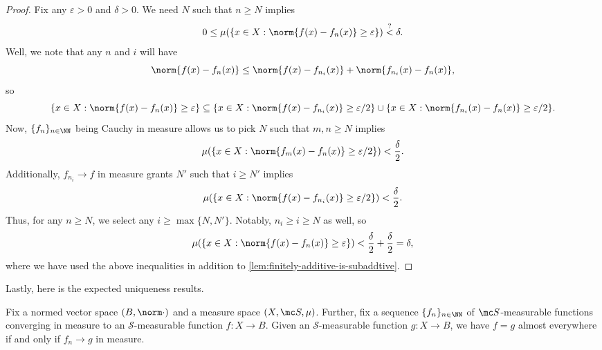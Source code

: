\documentclass[../notes.tex]{subfiles}
\begin{document}
\begin{proof}
	Fix any $\varepsilon>0$ and $\delta>0$. We need $N$ such that $n\ge N$ implies
	\[0\le\mu(\{x\in X:\norm{f(x)-f_n(x)}\ge\varepsilon\})\stackrel?<\delta.\]
	Well, we note that any $n$ and $i$ will have
	\[\norm{f(x)-f_n(x)}\le\norm{f(x)-f_{n_i}(x)}+\norm{f_{n_i}(x)-f_n(x)},\]
	so
	\[\{x\in X:\norm{f(x)-f_n(x)}\ge\varepsilon\}\subseteq\{x\in X:\norm{f(x)-f_{n_i}(x)}\ge\varepsilon/2\}\cup\{x\in X:\norm{f_{n_i}(x)-f_n(x)}\ge\varepsilon/2\}.\]
	Now, $\{f_n\}_{n\in\NN}$ being Cauchy in measure allows us to pick $N$ such that $m,n\ge N$ implies
	\[\mu(\{x\in X:\norm{f_m(x)-f_n(x)}\ge\varepsilon/2\})<\frac\delta2.\]
	Additionally, $f_{n_i}\to f$ in measure grants $N'$ such that $i\ge N'$ implies
	\[\mu(\{x\in X:\norm{f(x)-f_{n_i}(x)}\ge\varepsilon/2\})<\frac\delta2.\]
	Thus, for any $n\ge N$, we select any $i\ge\max\{N,N'\}$. Notably, $n_i\ge i\ge N$ as well, so
	\[\mu(\{x\in X:\norm{f(x)-f_n(x)}\ge\varepsilon\})<\frac\delta2+\frac\delta2=\delta,\]
	where we have used the above inequalities in addition to \autoref{lem:finitely-additive-is-subaddtive}.
\end{proof}
Lastly, here is the expected uniqueness results.
\begin{lemma} \label{lem:uniq-limit-in-measure}
	Fix a normed vector space $(B,\norm\cdot)$ and a measure space $(X,\mc S,\mu)$. Further, fix a sequence $\{f_n\}_{n\in\NN}$ of $\mc S$-measurable functions converging in measure to an $\mathcal S$-measurable function $f\colon X\to B$. Given an $\mathcal S$-measurable function $g\colon X\to B$, we have $f=g$ almost everywhere if and only if $f_n\to g$ in measure.
\end{lemma}
\end{document}
